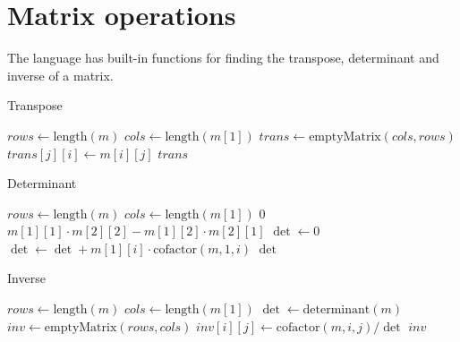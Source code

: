 \section{Matrix operations}\label{sec:matrix-ops}

The language has built-in functions for finding the transpose, determinant and inverse of a matrix.

\begin{algorithm}
    \caption{Transpose}
    \begin{algorithmic}
            \State $rows \gets \text{length}(m)$
            \State $cols \gets \text{length}(m[1])$
            \State $trans \gets \text{emptyMatrix}(cols, rows)$
                    \State $trans[j][i] \gets m[i][j]$
                \EndFor
            \EndFor
            \State \Return $trans$
        \EndFunction
    \end{algorithmic}\label{alg:algorithm8}
\end{algorithm}

\begin{algorithm}
    \caption{Determinant}
    \begin{algorithmic}
            \State $rows \gets \text{length}(m)$
            \State $cols \gets \text{length}(m[1])$
                \State \Return $0$
            \EndIf
                \State \Return $m[1][1] \cdot m[2][2] - m[1][2] \cdot m[2][1]$
            \EndIf
            \State $\det \gets 0$
                \State $\det \gets \det + m[1][i] \cdot \text{cofactor}(m, 1, i)$
            \EndFor
            \State \Return $\det$
        \EndFunction
    \end{algorithmic}\label{alg:algorithm9}
\end{algorithm}

\begin{algorithm}
    \caption{Inverse}
    \begin{algorithmic}
            \State $rows \gets \text{length}(m)$
            \State $cols \gets \text{length}(m[1])$
            \State $\det \gets \text{determinant}(m)$
                \State \Return {}
            \EndIf
            \State $inv \gets \text{emptyMatrix}(rows, cols)$
                    \State $inv[i][j] \gets \text{cofactor}(m, i, j) / \det$
                \EndFor
            \EndFor
            \State \Return $inv$
        \EndFunction
    \end{algorithmic}\label{alg:algorithm10}
\end{algorithm}